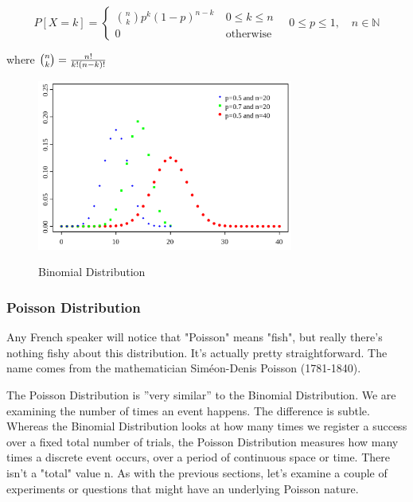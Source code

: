 \begin{equation}
    P\left[X = k\right] = \begin{cases} {n \choose k} p^k \left(1-p\right)^{n-k}\ & 0 \le k \le n \\ 0 & \mbox{otherwise} \end{cases} \quad 0 \leq p \leq 1, \quad n \in \mathbb{N}
\end{equation}

where ${n \choose k}={n! \over k!(n-k)!}$

\begin{figure}
  \centering
  \includegraphics[width=0.75\textwidth]{../Images/Binomial_distribution_pmf.png}\\
  \caption{Binomial Distribution}
\end{figure}


\subsubsection{Poisson Distribution}

Any French speaker will notice that "Poisson" means "fish", but really there's nothing fishy about this distribution. It's actually pretty straightforward. The name comes from the mathematician Siméon-Denis Poisson (1781-1840).

The Poisson Distribution is ''very similar'' to the Binomial Distribution. We are examining the number of times an event happens. The difference is subtle. Whereas the Binomial Distribution looks at how many times we register a success over a fixed total number of trials, the Poisson Distribution measures how many times a discrete event occurs, over a period of continuous space or time. There isn't a "total" value n. As with the previous sections, let's examine a couple of experiments or questions that might have an underlying Poisson nature.

